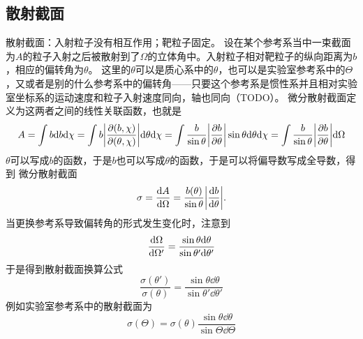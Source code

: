 \subsection{散射截面}

散射截面：入射粒子没有相互作用；靶粒子固定。
设在某个参考系当中一束截面为$A$的粒子入射之后被散射到了$\Omega$的立体角中。入射粒子相对靶粒子的纵向距离为$b$，相应的偏转角为$\theta$。
这里的$\theta$可以是质心系中的$\theta$，也可以是实验室参考系中的$\Theta$，又或者是别的什么参考系中的偏转角——只要这个参考系是惯性系并且相对实验室坐标系的运动速度和粒子入射速度同向，轴也同向（TODO）。
微分散射截面定义为这两者之间的线性关联函数，也就是
\[
    A = \int b \dd b \dd \chi = \int b \abs{\pdv{(b, \chi)}{(\theta, \chi)}} \dd \theta \dd \chi = \int \frac{b}{\sin \theta} \abs{\pdv{b}{\theta}} \sin \theta \dd \theta \dd \chi = \int \frac{b}{\sin \theta} \abs{\pdv{b}{\theta}} \dd \Omega
\]
$\theta$可以写成$b$的函数，于是$b$也可以写成$\theta$的函数，于是可以将偏导数写成全导数，得到
微分散射截面
\begin{equation}
    \sigma = \dv{A}{\Omega} = \frac{b(\theta)}{\sin \theta} \abs{\dv{b}{\theta}}.
    \label{eq:cross-section}
\end{equation}
当更换参考系导致偏转角的形式发生变化时，注意到
\[
    \dv{\Omega}{\Omega'} = \frac{\sin \theta \dd \theta}{\sin \theta' \dd \theta'}
\]
于是得到散射截面换算公式
\begin{equation}
    \frac{\sigma(\theta')}{\sigma(\theta)} = \frac{\sin \theta \dd \theta}{\sin \theta' \dd \theta'}
\end{equation}
例如实验室参考系中的散射截面为
\begin{equation}
    \sigma(\Theta) = \sigma(\theta) \frac{\sin \theta \dd \theta}{\sin \Theta \dd \Theta}
\end{equation}

